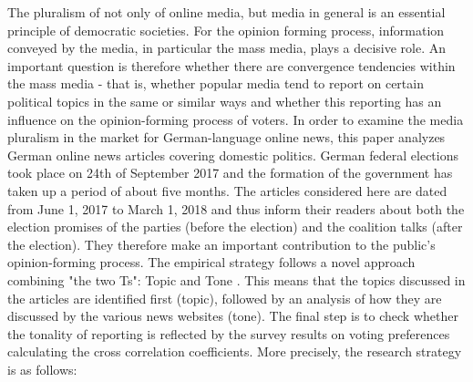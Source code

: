 \documentclass[12pt,a4paper,notitlepage]{article}
\begin{document}
The pluralism of not only of online media, but media in general is an essential principle of democratic societies. For the opinion forming process, information conveyed by the media, in particular the mass media, plays a decisive role. An important question is therefore whether there are convergence tendencies within the mass media - that is, whether popular media tend to report on certain political topics in the same or similar ways and whether this reporting has an influence on the opinion-forming process of voters. In order to examine the media pluralism in the market for German-language online news, this paper analyzes German online news articles covering domestic politics. German federal elections took place on 24th of September 2017 and the formation of the government has taken up a period of about five months. The articles considered here are dated from June 1, 2017 to March 1, 2018 and thus inform their readers about both the election promises of the parties (before the election) and the coalition talks (after the election). They therefore make an important contribution to the public's opinion-forming process. The empirical strategy follows a novel approach combining "the two Ts": Topic and Tone \citep{hansen_shocking_2016}. This means that the topics discussed in the articles are identified first (topic), followed by an analysis of how they are discussed by the various news websites (tone). The final step is to check whether the tonality of reporting is reflected by the survey results on voting preferences calculating the cross correlation coefficients. More precisely, the research strategy is as follows:
\end{document}
